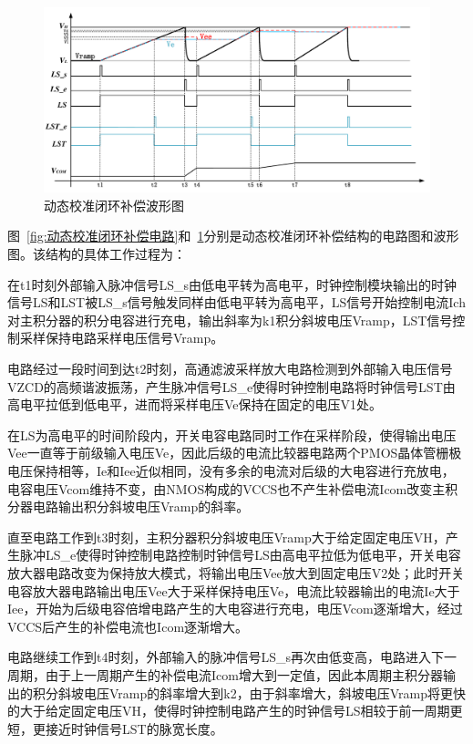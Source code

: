 \begin{figure}[htbp] 
    \centering
    \includegraphics[width=0.8\linewidth]{figures/主积分器环路波形图.pdf}
    \caption{动态校准闭环补偿波形图}
    \label{fig:动态校准闭环补偿波形图}
\end{figure} 

图~\ref{fig:动态校准闭环补偿电路}和~\ref{fig:动态校准闭环补偿波形图}分别是动态校准闭环补偿结构的电路图和波形图。该结构的具体工作过程为：

在t1时刻外部输入脉冲信号LS\_s由低电平转为高电平，时钟控制模块输出的时钟信号LS和LST被LS\_s信号触发同样由低电平转为高电平，LS信号开始控制电流Ich对主积分器的积分电容进行充电，输出斜率为k1积分斜坡电压Vramp，LST信号控制采样保持电路采样电压信号Vramp。

电路经过一段时间到达t2时刻，高通滤波采样放大电路检测到外部输入电压信号VZCD的高频谐波振荡，产生脉冲信号LS\_e使得时钟控制电路将时钟信号LST由高电平拉低到低电平，进而将采样电压Ve保持在固定的电压V1处。

在LS为高电平的时间阶段内，开关电容电路同时工作在采样阶段，使得输出电压Vee一直等于前级输入电压Ve，因此后级的电流比较器电路两个PMOS晶体管栅极电压保持相等，Ie和Iee近似相同，没有多余的电流对后级的大电容进行充放电，电容电压Vcom维持不变，由NMOS构成的VCCS也不产生补偿电流Icom改变主积分器电路输出积分斜坡电压Vramp的斜率。

直至电路工作到t3时刻，主积分器积分斜坡电压Vramp大于给定固定电压VH，产生脉冲LS\_e使得时钟控制电路控制时钟信号LS由高电平拉低为低电平，开关电容放大器电路改变为保持放大模式，将输出电压Vee放大到固定电压V2处；此时开关电容放大器电路输出电压Vee大于采样保持电压Ve，电流比较器输出的电流Ie大于Iee，开始为后级电容倍增电路产生的大电容进行充电，电压Vcom逐渐增大，经过VCCS后产生的补偿电流也Icom逐渐增大。

电路继续工作到t4时刻，外部输入的脉冲信号LS\_s再次由低变高，电路进入下一周期，由于上一周期产生的补偿电流Icom增大到一定值，因此本周期主积分器输出的积分斜坡电压Vramp的斜率增大到k2，由于斜率增大，斜坡电压Vramp将更快的大于给定固定电压VH，使得时钟控制电路产生的时钟信号LS相较于前一周期更短，更接近时钟信号LST的脉宽长度。


